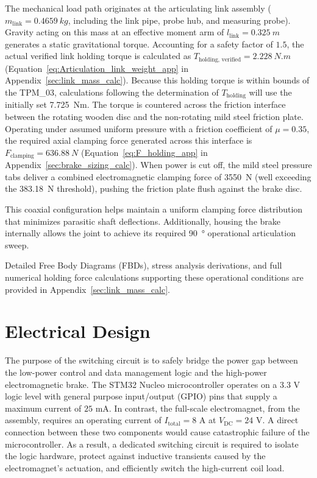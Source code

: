 The mechanical load path originates at the articulating link assembly ($m_{\text{link}} = \SI{0.4659}{kg}$, including the link pipe, probe hub, and measuring probe). Gravity acting on this mass at an effective moment arm of $l_{\text{link}} = \SI{0.325}{m}$ generates a static gravitational torque. Accounting for a safety factor of $1.5$, the actual verified link holding torque is calculated as $T_{\text{holding, verified}} = \SI{2.228}{N.m}$ (Equation~\ref{eq:Articulation_link_weight_app} in Appendix~\ref{sec:link_mass_calc}). Because this holding torque is within bounds of the TPM\_03, calculations following the determination of $T_{\text{holding}}$ will use the initially set \SI{7.725}{Nm}. The torque is countered across the friction interface between the rotating wooden disc and the non-rotating mild steel friction plate. Operating under assumed uniform pressure with a friction coefficient of $\mu = 0.35$, the required axial clamping force generated across this interface is $F_{\text{clamping}} = \SI{636.88}{N}$ (Equation~\ref{eq:F_holding_app} in Appendix~\ref{sec:brake_sizing_calc}). When power is cut off, the mild steel pressure tabs deliver a combined electromagnetic clamping force of \SI{3550}{N} (well exceeding the \SI{383.18}{N} threshold), pushing the friction plate flush against the brake disc.

This coaxial configuration helps maintain a uniform clamping force distribution that minimizes parasitic shaft deflections. Additionally, housing the brake internally allows the joint to achieve its required \SI{90}{\degree} operational articulation sweep.

Detailed Free Body Diagrams (FBDs), stress analysis derivations, and full numerical holding force calculations supporting these operational conditions are provided in Appendix~\ref{sec:link_mass_calc}.

\section{Electrical Design}

The purpose of the switching circuit is to safely bridge the power gap between the low-power control and data management logic and the high-power electromagnetic brake. The STM32 Nucleo microcontroller operates on a $3.3\text{ V}$ logic level with general purpose input/output (GPIO) pins that supply a maximum current of $25\text{ mA}$. In contrast, the full-scale electromagnet, from the assembly, requires an operating current of $I_{\text{total}} = 8\text{ A}$ at $V_{\text{DC}} = 24\text{ V}$. A direct connection between these two components would cause catastrophic failure of the microcontroller. As a result, a dedicated switching circuit is required to isolate the logic hardware, protect against inductive transients caused by the electromagnet's actuation, and efficiently switch the high-current coil load. 

